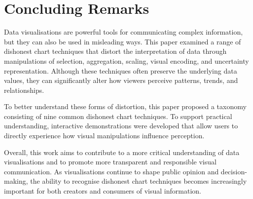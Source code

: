 %
%
% 
% 
% 


\chapter{Concluding Remarks}
\label{chap:Conclusion}

Data visualisations are powerful tools for communicating complex information, but they can also be used in misleading ways. This paper examined a range of dishonest chart techniques that distort the interpretation of data through manipulations of selection, aggregation, scaling, visual encoding, and uncertainty representation. Although these techniques often preserve the underlying data values, they can significantly alter how viewers perceive patterns, trends, and relationships.

To better understand these forms of distortion, this paper proposed a taxonomy consisting of nine common dishonest chart techniques. To support practical understanding, interactive demonstrations were developed that allow users to directly experience how visual manipulations influence perception. 

Overall, this work aims to contribute to a more critical understanding of data visualisations and to promote more transparent and responsible visual communication. As visualisations continue to shape public opinion and decision-making, the ability to recognise dishonest chart techniques becomes increasingly important for both creators and consumers of visual information.

